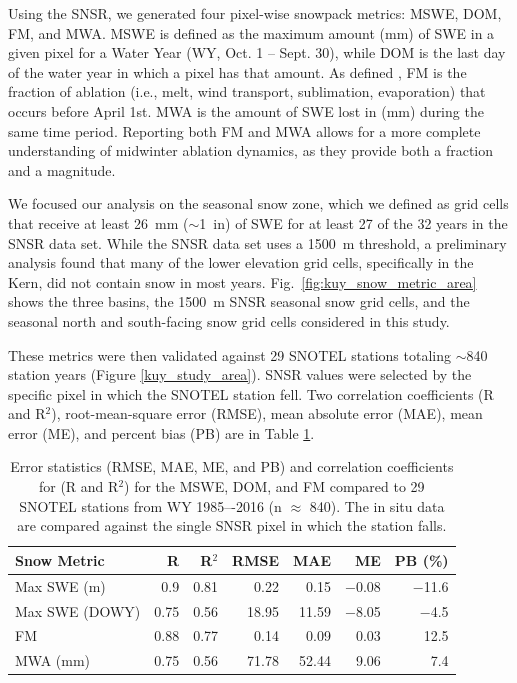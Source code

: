 Using the SNSR, we generated four pixel-wise snowpack metrics: MSWE, DOM, FM, and MWA. MSWE is defined as the maximum amount (mm) of SWE in a given pixel for a Water Year (WY, Oct. 1 -- Sept. 30), while DOM is the last day of the water year in which a pixel has that amount. As defined \cite{musselmanWinterMeltTrends2021}, FM is the fraction of ablation (i.e., melt, wind transport, sublimation, evaporation) that occurs before April 1st. MWA is the amount of SWE lost in (mm) during the same time period. Reporting both FM and MWA allows for a more complete understanding of midwinter ablation dynamics, as they provide both a fraction and a magnitude.

We focused our analysis on the seasonal snow zone, which we defined as grid cells that receive at least 26~mm ($\sim$1~in) of SWE for at least 27 of the 32 years in the SNSR data set. While the SNSR data set uses a 1500~m threshold, a preliminary analysis found that many of the lower elevation grid cells, specifically in the Kern, did not contain snow in most years. Fig.~\ref{fig:kuy_snow_metric_area} shows the three basins, the 1500~m SNSR seasonal snow grid cells, and the seasonal north and south-facing snow grid cells considered in this study.

These metrics were then validated against 29 SNOTEL stations totaling $\sim$840 station years (Figure \ref{kuy_study_area}). SNSR values were selected by the specific pixel in which the SNOTEL station fell. Two correlation coefficients (R and R$^{2}$), root-mean-square error (RMSE), mean absolute error (MAE), mean error (ME), and percent bias (PB) are in Table \ref{tab:snow_metrics_val_table}.


\begin{table}[htbp]
  \centering
  \caption{Error statistics (RMSE, MAE, ME, and PB) and correlation coefficients for (R and R$^{2}$) for the MSWE, DOM, and FM compared to 29 SNOTEL stations from WY 1985–-2016 (n $\approx$ 840). The in situ data are compared against the single SNSR pixel in which the station falls.}
  \label{tab:snow_metrics_val_table}
  \begin{tabular}{lrrrrrr}
    \toprule
    Snow Metric & R & R$^{2}$ & RMSE & MAE & ME & PB (\%) \\
    \midrule
    Max SWE (m) & 0.9 & 0.81 & 0.22 & 0.15 & $-$0.08 & $-$11.6 \\
    Max SWE (DOWY) & 0.75 & 0.56 & 18.95 & 11.59 & $-$8.05 & $-$4.5 \\
    FM & 0.88 & 0.77 & 0.14 & 0.09 & 0.03 & 12.5 \\
    MWA (mm) & 0.75 & 0.56 & 71.78 & 52.44 & 9.06 & 7.4 \\
    \bottomrule
  \end{tabular}
\end{table}

